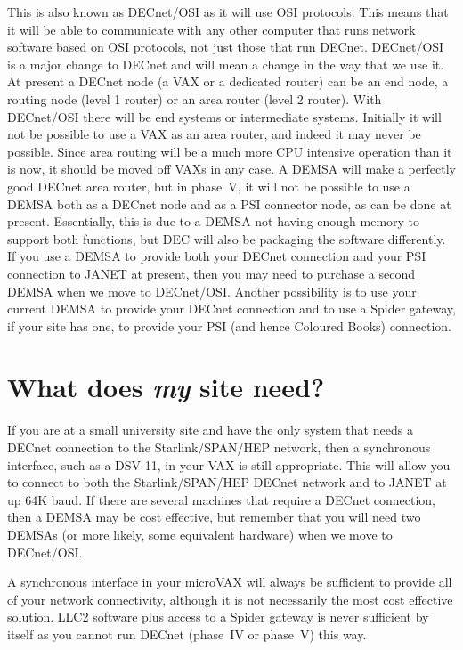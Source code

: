 This is also known as DECnet/OSI as it will use OSI protocols. This means that
it will be able to communicate with any other computer that runs network
software based on OSI protocols, not just those that run DECnet. DECnet/OSI is
a major change to DECnet and will mean a change in the way that we use it. At
present a DECnet node (a VAX or a dedicated router) can be an end node, a
routing node (level 1 router) or an area router (level 2 router). With
DECnet/OSI there will be end systems or intermediate systems. Initially it will
not be possible to use a VAX as an area router, and indeed it may never be
possible. Since area routing will be a much more CPU intensive operation than
it is now, it should be moved off VAXs in any case. A DEMSA will make a
perfectly good DECnet area router, but in phase~V, it will not be possible to
use a DEMSA both as a DECnet node and as a PSI connector node, as can be done
at present. Essentially, this is due to a DEMSA not having enough memory to
support both functions, but DEC will also be packaging the software differently.
If you use a DEMSA to provide both your DECnet connection and your PSI
connection to JANET at present, then you may need to purchase a second DEMSA
when we move to DECnet/OSI. Another possibility is to use your current DEMSA to
provide your DECnet connection and to use a Spider gateway, if your site has
one, to provide your PSI (and hence Coloured Books) connection.

\section{What does {\em my} site need?}

If you are at a small
university site and have the only system that needs a DECnet connection to
the Starlink/SPAN/HEP network, then a synchronous interface, such as a
DSV-11, in your VAX is still appropriate. This will allow you to connect to
both the Starlink/SPAN/HEP DECnet network and to JANET at up 64K baud. If
there are several machines that require a DECnet connection, then a DEMSA
may be cost effective, but remember that you will need two DEMSAs (or more
likely, some equivalent hardware) when we move to DECnet/OSI.

A synchronous interface in your microVAX will always be sufficient to provide
all of your network connectivity, although it is not necessarily the most
cost effective solution. LLC2 software plus access to a Spider gateway is
never sufficient by itself as you cannot run DECnet (phase~IV or phase~V)
this way.

